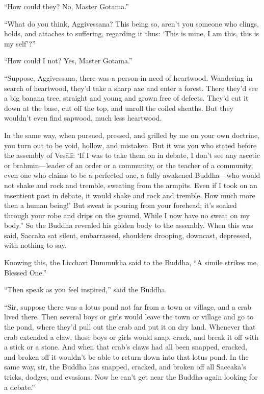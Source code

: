 \documentclass[12pt,openany]{book}%
\begin{document}
“How could they? No, Master Gotama.” 

“What do you think, Aggivessana? This being so, aren’t you someone who clings, holds, and attaches to suffering, regarding it thus: ‘This is mine, I am this, this is my self’?” 

“How could I not? Yes, Master Gotama.” 

“Suppose, Aggivessana, there was a person in need of heartwood. Wandering in search of heartwood, they’d take a sharp axe and enter a forest. There they’d see a big banana tree, straight and young and grown free of defects. They’d cut it down at the base, cut off the top, and unroll the coiled sheaths. But they wouldn’t even find sapwood, much less heartwood. 

In the same way, when pursued, pressed, and grilled by me on your own doctrine, you turn out to be void, hollow, and mistaken. But it was you who stated before the assembly of \textsanskrit{Vesālī}: ‘If I was to take them on in debate, I don’t see any ascetic or brahmin—leader of an order or a community, or the teacher of a community, even one who claims to be a perfected one, a fully awakened Buddha—who would not shake and rock and tremble, sweating from the armpits. Even if I took on an insentient post in debate, it would shake and rock and tremble. How much more then a human being!’ But sweat is pouring from your forehead; it’s soaked through your robe and drips on the ground. While I now have no sweat on my body.” So the Buddha revealed his golden body to the assembly. When this was said, Saccaka sat silent, embarrassed, shoulders drooping, downcast, depressed, with nothing to say. 

Knowing this, the Licchavi Dummukha said to the Buddha, “A simile strikes me, Blessed One.” 

“Then speak as you feel inspired,” said the Buddha. 

“Sir, suppose there was a lotus pond not far from a town or village, and a crab lived there. Then several boys or girls would leave the town or village and go to the pond, where they’d pull out the crab and put it on dry land. Whenever that crab extended a claw, those boys or girls would snap, crack, and break it off with a stick or a stone. And when that crab’s claws had all been snapped, cracked, and broken off it wouldn’t be able to return down into that lotus pond. In the same way, sir, the Buddha has snapped, cracked, and broken off all Saccaka’s tricks, dodges, and evasions. Now he can’t get near the Buddha again looking for a debate.” 
\end{document}
